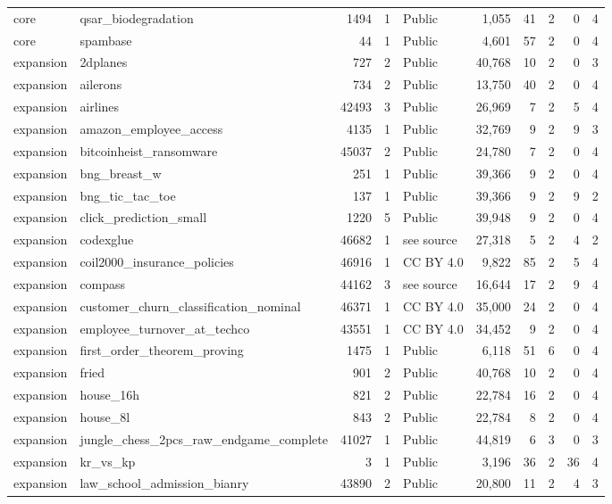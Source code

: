 \begin{table}[htbp]
\begin{adjustbox}{max width=\linewidth}
\begin{tabular}{llrrlrrrrr}
core & qsar\_biodegradation & 1494 & 1 & Public & 1{,}055 & 41 & 2 & 0 & 4 \\
core & spambase & 44 & 1 & Public & 4{,}601 & 57 & 2 & 0 & 4 \\
\midrule
expansion & 2dplanes & 727 & 2 & Public & 40{,}768 & 10 & 2 & 0 & 3 \\
expansion & ailerons & 734 & 2 & Public & 13{,}750 & 40 & 2 & 0 & 4 \\
expansion & airlines & 42493 & 3 & Public & 26{,}969 & 7 & 2 & 5 & 4 \\
expansion & amazon\_employee\_access & 4135 & 1 & Public & 32{,}769 & 9 & 2 & 9 & 3 \\
expansion & bitcoinheist\_ransomware & 45037 & 2 & Public & 24{,}780 & 7 & 2 & 0 & 4 \\
expansion & bng\_breast\_w & 251 & 1 & Public & 39{,}366 & 9 & 2 & 0 & 4 \\
expansion & bng\_tic\_tac\_toe & 137 & 1 & Public & 39{,}366 & 9 & 2 & 9 & 2 \\
expansion & click\_prediction\_small & 1220 & 5 & Public & 39{,}948 & 9 & 2 & 0 & 4 \\
expansion & codexglue & 46682 & 1 & see source & 27{,}318 & 5 & 2 & 4 & 2 \\
expansion & coil2000\_insurance\_policies & 46916 & 1 & CC BY 4.0 & 9{,}822 & 85 & 2 & 5 & 4 \\
expansion & compass & 44162 & 3 & see source & 16{,}644 & 17 & 2 & 9 & 4 \\
expansion & customer\_churn\_classification\_nominal & 46371 & 1 & CC BY 4.0 & 35{,}000 & 24 & 2 & 0 & 4 \\
expansion & employee\_turnover\_at\_techco & 43551 & 1 & CC BY 4.0 & 34{,}452 & 9 & 2 & 0 & 4 \\
expansion & first\_order\_theorem\_proving & 1475 & 1 & Public & 6{,}118 & 51 & 6 & 0 & 4 \\
expansion & fried & 901 & 2 & Public & 40{,}768 & 10 & 2 & 0 & 4 \\
expansion & house\_16h & 821 & 2 & Public & 22{,}784 & 16 & 2 & 0 & 4 \\
expansion & house\_8l & 843 & 2 & Public & 22{,}784 & 8 & 2 & 0 & 4 \\
expansion & jungle\_chess\_2pcs\_raw\_endgame\_complete & 41027 & 1 & Public & 44{,}819 & 6 & 3 & 0 & 3 \\
expansion & kr\_vs\_kp & 3 & 1 & Public & 3{,}196 & 36 & 2 & 36 & 4 \\
expansion & law\_school\_admission\_bianry & 43890 & 2 & Public & 20{,}800 & 11 & 2 & 4 & 3 \\

\end{tabular}
\end{adjustbox}
\end{table}

